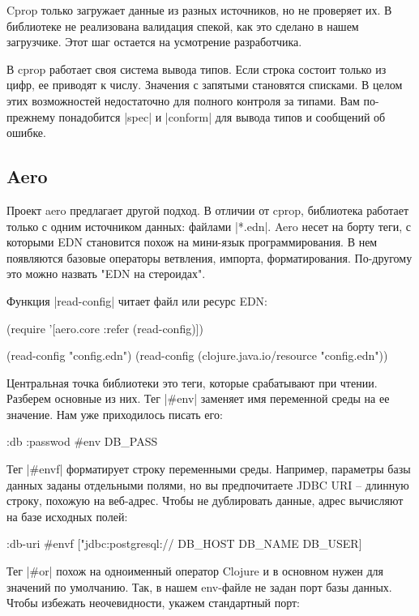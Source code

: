 Cprop только загружает данные из разных источников, но не проверяет их. В
библиотеке не реализована валидация спекой, как это сделано в нашем
загрузчике. Этот шаг остается на усмотрение разработчика.

В cprop работает своя система вывода типов. Если строка состоит только из цифр,
ее приводят к числу. Значения с запятыми становятся списками. В целом этих
возможностей недостаточно для полного контроля за типами. Вам по-прежнему
понадобится \spverb|spec| и \spverb|conform| для вывода типов и сообщений об ошибке.

\subsection{Aero}

Проект aero предлагает другой подход. В отличии от cprop, библиотека работает
только с одним источником данных: файлами \spverb|*.edn|. Aero несет на борту теги, с
которыми EDN становится похож на мини-язык программирования. В нем появляются
базовые операторы ветвления, импорта, форматирования. По-другому это можно
назвать "EDN на стероидах".

Функция \spverb|read-config| читает файл или ресурс EDN:

\begin{code}
(require '[aero.core :refer (read-config)])

(read-config "config.edn")
(read-config (clojure.java.io/resource "config.edn"))
\end{code}

Центральная точка библиотеки это теги, которые срабатывают при чтении. Разберем
основные из них. Тег \spverb|#env| заменяет имя переменной среды на ее значение. Нам
уже приходилось писать его:

\begin{code}
{:db {:passwod #env DB_PASS}}
\end{code}

Тег \spverb|#envf| форматирует строку переменными среды. Например, параметры базы
данных заданы отдельными полями, но вы предпочитаете JDBC URI -- длинную строку,
похожую на веб-адрес. Чтобы не дублировать данные, адрес вычисляют на базе
исходных полей:

\begin{code}
{:db-uri #envf ["jdbc:postgresql://%
                DB_HOST DB_NAME DB_USER]}
\end{code}

Тег \spverb|#or| похож на одноименный оператор Clojure и в основном нужен для значений
по умолчанию. Так, в нашем env-файле не задан порт базы данных. Чтобы избежать
неочевидности, укажем стандартный порт:

